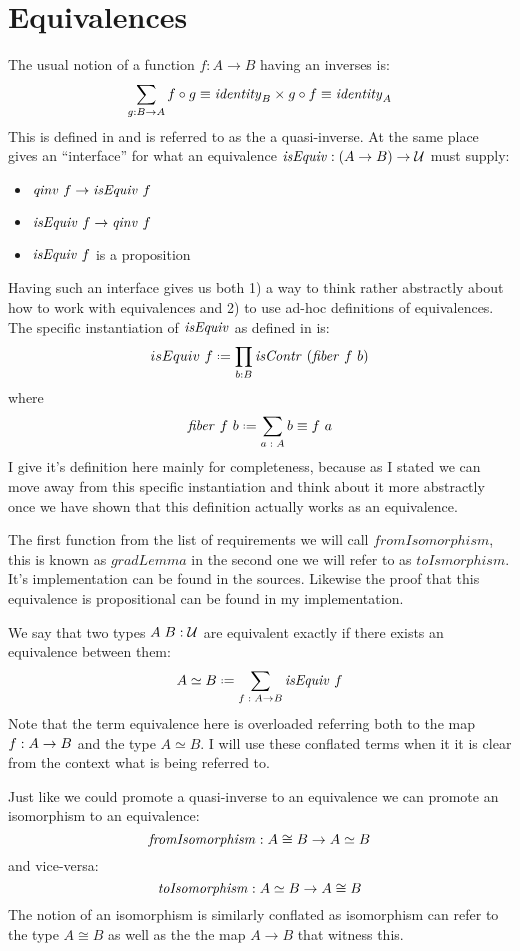 \section{Equivalences}
\label{equiv}
The usual notion of a function $f : A \to B$ having an inverses is:
%
$$
\sum_{g : B \to A} f \circ g \equiv \mathit{identity}_{B} \times g \circ f \equiv \mathit{identity}_{A}
$$
%
This is defined in \cite[p. 129]{hott-2013} and is referred to as the a
quasi-inverse. At the same place \cite{hott-2013} gives an ``interface'' for
what an equivalence $\mathit{isEquiv} : (A \to B) \to \mathcal{U}$ must supply:
%
\begin{itemize}
\item
  $\qinv\ f \to \isEquiv\ f$
\item
  $\isEquiv\ f \to \qinv\ f$
\item
  $\mathit{isEquiv}\ f$ is a proposition
\end{itemize}
%
Having such an interface gives us both 1) a way to think rather abstractly about
how to work with equivalences and 2) to use ad-hoc definitions of equivalences.
The specific instantiation of $\mathit{isEquiv}$ as defined in \cite{cubical} is:
%
$$
isEquiv\ f \defeq \prod_{b : B} \isContr\ (\fiber\ f\ b)
$$
where
$$
\fiber\ f\ b \defeq \sum_{a \tp A} b \equiv f\ a
$$
%
I give it's definition here mainly for completeness, because as I stated we can
move away from this specific instantiation and think about it more abstractly
once we have shown that this definition actually works as an equivalence.

The first function from the list of requirements we will call
$\mathit{fromIsomorphism}$, this is known as $\mathit{gradLemma}$ in
\cite{cubical} the second one we will refer to as $\mathit{toIsmorphism}$. It's
implementation can be found in the sources. Likewise the proof that this
equivalence is propositional can be found in my implementation.

We say that two types $A\;B \;\mathord{:}\; \mathcal{U}$ are equivalent exactly if there exists an
equivalence between them:
%
$$
A \simeq B \defeq \sum_{f \tp A \to B} \isEquiv\ f
$$
%
Note that the term equivalence here is overloaded referring both to the map $f
\;\mathord{:}\; A \to B$ and the type $A \simeq B$. I will use these conflated terms when it
it is clear from the context what is being referred to.

Just like we could promote a quasi-inverse to an equivalence we can promote an
isomorphism to an equivalence:
%
$$
\mathit{fromIsomorphism} \;\mathord{:}\; A \cong B \to A \simeq B
$$
%
and vice-versa:
%
$$
\mathit{toIsomorphism} \;\mathord{:}\; A \simeq B \to A \cong B
$$
%
The notion of an isomorphism is similarly conflated as isomorphism can refer to
the type $A \cong B$ as well as the the map $A \to B$ that witness this.

